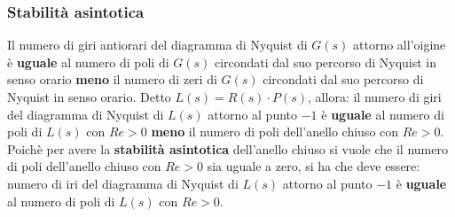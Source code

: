 \begin{landscape}
\begin{multicols*}{3}
    \subsubsection*{Stabilità asintotica}
    Il numero di giri antiorari del diagramma di Nyquist di $G(s)$ attorno all'oigine è \textbf{uguale} al numero di poli di $G(s)$ circondati dal suo percorso di Nyquist in senso orario \textbf{meno} il numero di zeri di $G(s)$ circondati dal suo percorso di Nyquist in senso orario.\newline
    \newline
    Detto $L(s) = R(s) \cdot P(s)$, allora:\newline
    il numero di giri del diagramma di Nyquist di $L(s)$ attorno al punto $-1$ è \textbf{uguale} al numero di poli di $L(s)$ con $Re> 0$ \textbf{meno} il numero di poli dell'anello chiuso con $Re > 0$.\newline
    \newline
    Poichè per avere la \textbf{stabilità asintotica} dell'anello chiuso si vuole che il numero di poli dell'anello chiuso con $Re > 0$ sia uguale a zero, si ha che deve essere:\newline
    numero di iri del diagramma di Nyquist di $L(s)$ attorno al punto $-1$ è \textbf{uguale} al numero di poli di $L(s)$ con $Re > 0$.

\end{multicols*}
\end{landscape}
